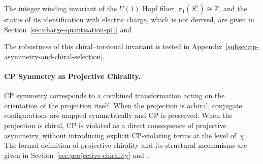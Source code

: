     The integer winding invariant of the $U(1)$ Hopf fiber,
    $\pi_1(S^1) \cong \mathbb{Z}$, and the status of its identification with
    electric charge, which is not derived, are given in
    Section~\ref{sec:charge-quantisation-pi1} and~\cite{Beau2026k}.

    The robustness of this chiral--torsional invariant is tested in
    Appendix~\ref{subsec:cp-asymmetry-and-chiral-selection}.

    \paragraph{CP Symmetry as Projective Chirality.}
      \label{subsec:cp-as-projective-chirality}
      CP symmetry corresponds to a combined transformation acting on the
      orientation of the projection itself.
      When the projection is achiral, conjugate configurations are mapped
      symmetrically and CP is preserved.
      When the projection is chiral, CP is violated as a direct consequence of
      projective asymmetry, without introducing explicit CP-violating terms at
      the level of~$\chi$.
      The formal definition of projective chirality and its structural
      mechanisms are given in Section~\ref{sec:projective-chirality}
      and~\cite{Beau2026k}.
